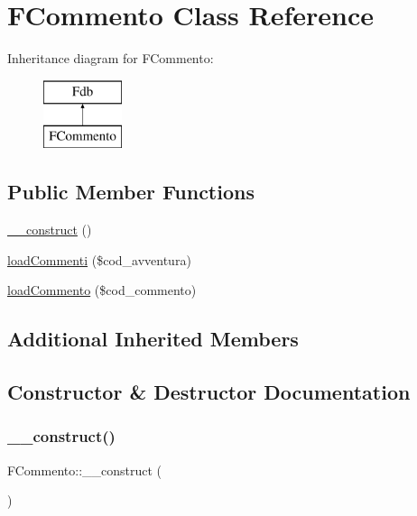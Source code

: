 \hypertarget{class_f_commento}{}\section{F\+Commento Class Reference}
\label{class_f_commento}
Inheritance diagram for F\+Commento\+:\begin{figure}[H]
\begin{center}
\leavevmode
\includegraphics[height=2.000000cm]{class_f_commento}
\end{center}
\end{figure}
\subsection*{Public Member Functions}
\begin{DoxyCompactItemize}
\item 
\mbox{\hyperlink{class_f_commento_a9f5497be71540e6aabb32dc214de2b26}{\+\_\+\+\_\+construct}} ()
\item 
\mbox{\hyperlink{class_f_commento_aa10e3f0355ea0f0a31a14063a4d0318d}{load\+Commenti}} (\$cod\+\_\+avventura)
\item 
\mbox{\hyperlink{class_f_commento_a575ec007020823deec1607b1acdc6d82}{load\+Commento}} (\$cod\+\_\+commento)
\end{DoxyCompactItemize}
\subsection*{Additional Inherited Members}


\subsection{Constructor \& Destructor Documentation}
\mbox{\label{class_f_commento_a9f5497be71540e6aabb32dc214de2b26}} 
\subsubsection{\texorpdfstring{\+\_\+\+\_\+construct()}{\_\_construct()}}
{\footnotesize\ttfamily F\+Commento\+::\+\_\+\+\_\+construct (\begin{DoxyParamCaption}{ }\end{DoxyParamCaption})}

